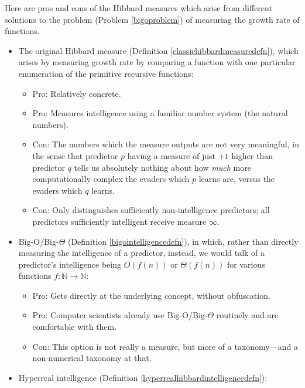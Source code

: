 \documentclass{article}
\begin{document}
Here are pros and cons of the Hibbard measures which arise from different solutions
to the problem (Problem \ref{bigoproblem}) of measuring the growth rate of functions.

\begin{itemize}
    \item
    The original Hibbard measure (Definition \ref{classichibbardmeasuredefn}),
    which arises by measuring growth rate by comparing
    a function with one particular enumeration \cite{liu1960enumeration} of the primitive
    recursive functions:
    \begin{itemize}
        \item
        Pro: Relatively concrete.
        \item
        Pro: Measures intelligence using a familiar number system (the natural numbers).
        \item
        Con: The numbers which the measure outputs are not very meaningful, in the sense
        that predictor $p$ having a measure of
        just $+1$ higher than predictor $q$ tells us absolutely
        nothing about how \emph{much} more computationally complex the evaders which $p$
        learns are, versus the evaders which $q$ learns.
        \item
        Con: Only distinguishes sufficiently non-intelligence predictors; all predictors
        sufficiently intelligent receive measure $\infty$.
    \end{itemize}
    \item
    Big-O/Big-$\Theta$ (Definition \ref{bigointelligencedefn}),
    in which, rather than directly measuring the intelligence of a predictor, instead, we
    would talk of a predictor's intelligence being $O(f(n))$ or $\Theta(f(n))$
    for various functions $f:\mathbb N\to\mathbb N$:
    \begin{itemize}
        \item
        Pro: Gets directly at the underlying concept, without obfuscation.
        \item
        Pro: Computer scientists already use Big-O/Big-$\Theta$ routinely
        and are comfortable with them.
        \item
        Con: This option is not really a measure, but more of a taxonomy---and a non-numerical
        taxonomy at that.
    \end{itemize}
    \item
    Hyperreal intelligence (Definition \ref{hyperrealhibbardintelligencedefn}):
    \begin{itemize}

\end{itemize}
\end{itemize}
\end{document}
